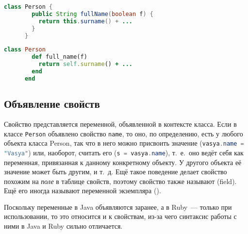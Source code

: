 \documentclass[a4paper, 14pt, titlepage]{extarticle}
\newcommand{\define}[1]{\uwave{#1}}
\newcommand{\ie}{т.~е.~}
\newenvironment{halfpage}%
    {\noindent\begin{minipage}[h]{0.49\linewidth}} %
    {\end{minipage}\hfill}
\newcommand{\inlinecode}[2][Java]{\lstinline[basicstyle=\ttfamily, language=#1]{#2}}
\begin{document}
  \begin{halfpage}
    \begin{lstlisting}[language=Java, title={Метод в Java}, gobble=6, texcl]
      class Person {
        public String fullName(boolean f) {
          return this.surname() + ...
        }
      }
    \end{lstlisting}
  \end{halfpage}
  \begin{halfpage}
    \begin{lstlisting}[language=Ruby, title={Метод в Ruby}, gobble=6, texcl]
      class Person
        def full_name(f)
          return self.surname() + ...
        end
      end
    \end{lstlisting}
  \end{halfpage}

  \subsection{Объявление свойств}

  Свойство представляется переменной, объявленной в контексте класса. Если в классе
  \inlinecode{Person} объявлено свойство \inlinecode{name}, то оно, по определению, есть у любого
  объекта класса Person, так что в него можно присвоить значение (\inlinecode{vasya.name = "Vasya"})
  или, наоборот, считать его (\inlinecode{s = vasya.name}), \ie оно ведёт себя как переменная,
  привязанная к данному конкретному объекту. У другого объекта её значение может быть другим, и
  т.~д. Ещё такое поведение делает свойство похожим на \emph{поле} в таблице свойств, поэтому свойство
  также называют \define{полем} (field). Ещё его иногда называют переменной экземпляра
  (\define{instance variable}).

  Поскольку переменные в Java объявляются заранее, а в Ruby~--- только при использовании, то это
  относится и к свойствам, из-за чего синтаксис работы с ними в Java и Ruby сильно отличается.
\end{document}
